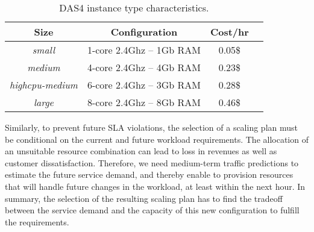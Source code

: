 \begin{table}
  {\scriptsize 
\begin{center}
    \begin{tabular}{  | c | c | c | c | }
    \hline
       \textbf{Size}  & \textbf{Configuration} & \textbf{Cost/hr} \\ \hline
   \textit{small}   & 1-core 2.4Ghz -- 1Gb RAM&  0.05\$ \\ \hline
   \textit{medium}   & 4-core 2.4Ghz  -- 4Gb RAM&  0.23\$ \\ \hline
\textit{highcpu-medium} & 6-core 2.4Ghz -- 3Gb RAM& 0.28\$   \\ \hline
\textit{large} & 8-core 2.4Ghz  -- 8Gb RAM& 0.46\$   \\ \hline

 \end{tabular}
\end{center}
\vspace{-5mm}
\caption{DAS4 instance type characteristics.}
\label{DAS4instances}
}
\end{table}

Similarly, to prevent future SLA violations, the selection of a scaling plan must be conditional on the current and future workload requirements. The allocation of an unsuitable resource combination can lead to loss in revenues as well as customer dissatisfaction. Therefore, we need medium-term traffic predictions to estimate the future service demand, and thereby enable to provision resources that will handle future changes in the workload, at least within the next hour. In summary, the selection of the resulting scaling plan has to find the tradeoff between the service demand and the capacity of this new configuration to fulfill the requirements. 




